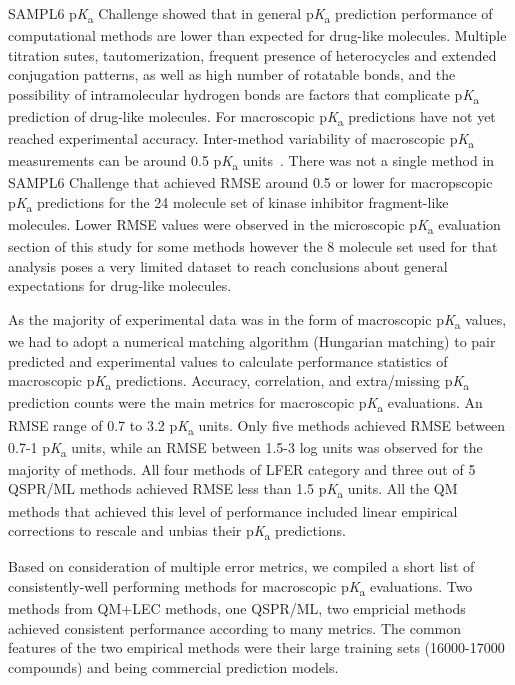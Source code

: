 \documentclass[9pt,lineno,final]{elife}
\newcommand{\pKa}{p\textit{K}\textsubscript{a}}
\begin{document}
SAMPL6 \pKa{} Challenge showed that in general \pKa{} prediction performance of computational methods are lower than expected for drug-like molecules.   
Multiple titration sutes, tautomerization, frequent presence of heterocycles and extended conjugation patterns, as well as high number of rotatable bonds, and the possibility of intramolecular hydrogen bonds are factors that complicate \pKa{} prediction of drug-like molecules.
For macroscopic \pKa{} predictions have not yet reached experimental accuracy. 
Inter-method variability of macroscopic \pKa{} measurements can be around 0.5 \pKa{} units~\citep{Fraczkiewicz:2013:ReferenceModuleinChemistryMolecularSciencesandChemicalEngineering}. 
There was not a single method in SAMPL6 Challenge that achieved RMSE around 0.5 or lower for macropscopic \pKa{} predictions for the 24 molecule set of kinase inhibitor fragment-like molecules.
Lower RMSE values were observed in the microscopic \pKa{} evaluation section of this study for some methods however the 8 molecule set used for that analysis poses a very limited dataset to reach conclusions about general expectations for drug-like molecules.

As the majority of experimental data was in the form of macroscopic \pKa{} values, we had to adopt a numerical matching algorithm (Hungarian matching) to pair predicted and experimental values to calculate performance statistics of macroscopic \pKa{} predictions. Accuracy, correlation, and extra/missing \pKa{} prediction counts were the main metrics for macroscopic \pKa{} evaluations. An RMSE range of 0.7 to 3.2 \pKa{} units.
Only five methods achieved RMSE between 0.7-1 \pKa{} units, while an RMSE between 1.5-3 log units was observed for the majority of methods. All four methods of LFER category and three out of 5 QSPR/ML methods achieved RMSE less than 1.5 \pKa{} units. All the QM methods that achieved this level of performance included linear empirical corrections to rescale and unbias their \pKa{} predictions. 

Based on consideration of multiple error metrics, we compiled a short list of consistently-well performing methods for macroscopic \pKa{} evaluations. Two methods from QM+LEC methods, one QSPR/ML, two empricial methods achieved consistent performance according to many metrics. The common features of the two empirical methods were their large training sets (16000-17000 compounds) and being commercial prediction models.
\end{document}
